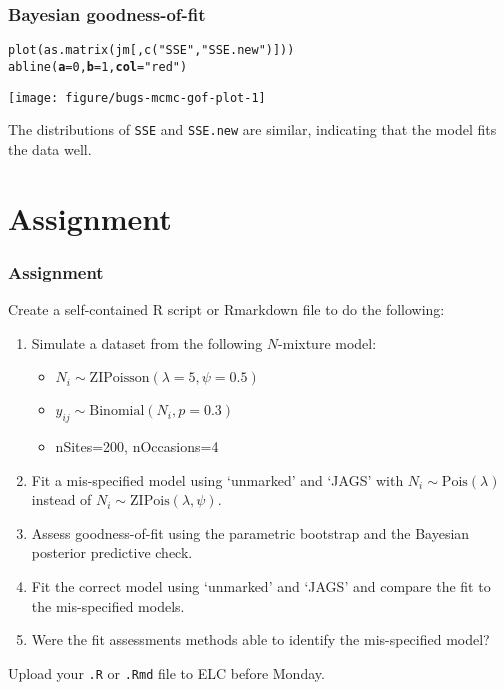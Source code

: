 \documentclass[color=usenames,dvipsnames]{beamer}\usepackage[]{graphicx}\usepackage[]{color}
\makeatletter
\newcommand{\hlnum}[1]{\textcolor[rgb]{0.69,0.494,0}{#1}}%
\newcommand{\hlstr}[1]{\textcolor[rgb]{0.749,0.012,0.012}{#1}}%
\newcommand{\hlstd}[1]{\textcolor[rgb]{0,0,0}{#1}}%
\newcommand{\hlkwc}[1]{\textcolor[rgb]{0,0,0}{\textbf{#1}}}%
\newcommand{\hlkwd}[1]{\textcolor[rgb]{0.004,0.004,0.506}{#1}}%
\newenvironment{kframe}{%
 \def\at@end@of@kframe{}%
 \ifinner\ifhmode%
  \def\at@end@of@kframe{\end{minipage}}%
  \begin{minipage}{\columnwidth}%
 \fi\fi%
 \def\FrameCommand##1{\hskip\@totalleftmargin \hskip-\fboxsep
 \colorbox{shadecolor}{##1}\hskip-\fboxsep
     \hskip-\linewidth \hskip-\@totalleftmargin \hskip\columnwidth}%
 \MakeFramed {\advance\hsize-\width
   \@totalleftmargin\z@ \linewidth\hsize
   \@setminipage}}%
 {\par\unskip\endMakeFramed%
 \at@end@of@kframe}
\newenvironment{knitrout}{}{} %
\newcommand{\inr}[1]{\colorbox{inlinecolor}{\texttt{#1}}}
\makeatother
\begin{document}
\begin{frame}[fragile]
  \frametitle{Bayesian goodness-of-fit}
\begin{knitrout}\footnotesize
{}\color{fgcolor}\begin{kframe}
\begin{alltt}
\hlkwd{plot}\hlstd{(}\hlkwd{as.matrix}\hlstd{(jm[,}\hlkwd{c}\hlstd{(}\hlstr{"SSE"}\hlstd{,} \hlstr{"SSE.new"}\hlstd{)]))}
\hlkwd{abline}\hlstd{(}\hlkwc{a}\hlstd{=}\hlnum{0}\hlstd{,} \hlkwc{b}\hlstd{=}\hlnum{1}\hlstd{,} \hlkwc{col}\hlstd{=}\hlstr{"red"}\hlstd{)}
\end{alltt}
\end{kframe}

{\centering \texttt{[image: figure/bugs-mcmc-gof-plot-1]} 

}



\end{knitrout}
  \vfill
  \small
  The distributions of {\tt SSE} and {\tt SSE.new} are similar,
  indicating that the model fits the data well.
\end{frame}






\section{Assignment}




\begin{frame}[fragile]
  \frametitle{Assignment}
  \footnotesize
  Create a self-contained R script or Rmarkdown file
  to do the following:
  \vfill
  \begin{enumerate}
    \footnotesize
    \item Simulate a dataset from the following $N$-mixture model:
      \begin{itemize}
        \footnotesize
        \item $N_i \sim \mathrm{ZIPoisson}(\lambda=5, \psi=0.5)$
        \item $y_{ij} \sim \mathrm{Binomial}(N_i, p=0.3)$
        \item nSites=200, nOccasions=4
      \end{itemize}
    \item Fit a \alert{mis-specified model} using `unmarked' and `JAGS' with
      $N_i \sim \mathrm{Pois}(\lambda)$ instead of
      $N_i \sim \mathrm{ZIPois}(\lambda, \psi)$.
    \item Assess goodness-of-fit using the parametric bootstrap and
      the Bayesian posterior predictive check.
    \item Fit the \alert{correct model} using `unmarked' and `JAGS'
      and compare the fit to the mis-specified models.
    \item Were the fit assessments methods able to identify the
      mis-specified model?
  \end{enumerate}
  \vfill
  Upload your {\tt .R} or {\tt .Rmd} file to ELC before Monday. 
\end{frame}
\end{document}
